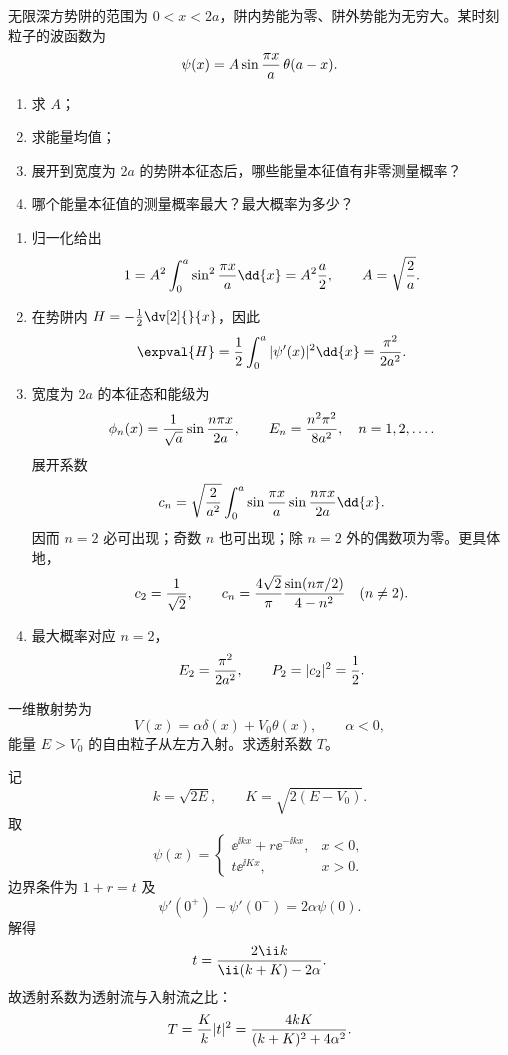 \begin{question}
无限深方势阱的范围为 $0<x<2a$，阱内势能为零、阱外势能为无穷大。某时刻粒子的波函数为
\[
  \psi(x)=A\sin {\pi x\over a}\,\theta(a-x).
\]
\begin{enumerate}
  \item 求 $A$；
  \item 求能量均值；
  \item 展开到宽度为 $2a$ 的势阱本征态后，哪些能量本征值有非零测量概率？
  \item 哪个能量本征值的测量概率最大？最大概率为多少？
\end{enumerate}
\begin{solution}
\begin{enumerate}
  \item 归一化给出
  \[
    1=A^2\int_0^a\sin^2{\pi x\over a}\dd{x}=A^2{a\over 2},
    \qquad A=\sqrt{2\over a}.
  \]
  \item 在势阱内 $H=-\frac12\dv[2]{}{x}$，因此
  \[
    \expval{H}= {1\over 2}\int_0^a |\psi'(x)|^2\dd{x}
    ={\pi^2\over 2a^2}.
  \]
  \item 宽度为 $2a$ 的本征态和能级为
  \[
    \phi_n(x)={1\over \sqrt a}\sin {n\pi x\over 2a},
    \qquad E_n={n^2\pi^2\over 8a^2},\quad n=1,2,\ldots .
  \]
  展开系数
  \[
    c_n=\sqrt{2\over a^2}\int_0^a\sin {\pi x\over a}\sin {n\pi x\over 2a}\dd{x}.
  \]
  因而 $n=2$ 必可出现；奇数 $n$ 也可出现；除 $n=2$ 外的偶数项为零。更具体地，
  \[
    c_2={1\over\sqrt2},\qquad
    c_n={4\sqrt2\over \pi}{\sin(n\pi/2)\over 4-n^2}\quad(n\ne 2).
  \]
  \item 最大概率对应 $n=2$，
  \[
    E_2={\pi^2\over 2a^2},\qquad P_2=|c_2|^2={1\over 2}.
  \]
\end{enumerate}
\end{solution}
\end{question}

\begin{question}
一维散射势为
\[
  V(x)=\alpha\delta(x)+V_0\theta(x),\qquad \alpha<0,
\]
能量 $E>V_0$ 的自由粒子从左方入射。求透射系数 $T$。
\begin{solution}
记
\[
  k=\sqrt{2E},\qquad K=\sqrt{2(E-V_0)} .
\]
取
\[
  \psi(x)=\begin{cases}
  \ee^{\ii kx}+r\ee^{-\ii kx},&x<0,\\
  t\ee^{\ii Kx},&x>0.
  \end{cases}
\]
边界条件为 $1+r=t$ 及
\[
  \psi'(0^+)-\psi'(0^-)=2\alpha\psi(0).
\]
解得
\[
  t={2\ii k\over \ii(k+K)-2\alpha}.
\]
故透射系数为透射流与入射流之比：
\[
  T={K\over k}|t|^2={4kK\over (k+K)^2+4\alpha^2}.
\]
\end{solution}
\end{question}

